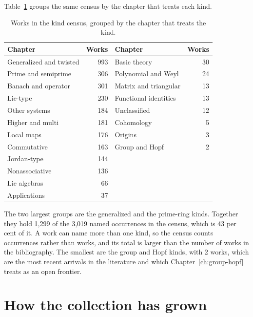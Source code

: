 Table~\ref{tab:atlas:kinds-chapters} groups the same census by the chapter that
treats each kind.

\begin{table}[htbp]
  \centering
  \caption{Works in the kind census, grouped by the chapter that treats the
  kind.}
  \label{tab:atlas:kinds-chapters}
  \begin{tabular}{lr@{\qquad}lr}
    \toprule
    Chapter & Works & Chapter & Works \\
    \midrule
    Generalized and twisted & 993 & Basic theory          & 30 \\
    Prime and semiprime     & 306 & Polynomial and Weyl   & 24 \\
    Banach and operator     & 301 & Matrix and triangular & 13 \\
    Lie-type                & 230 & Functional identities & 13 \\
    Other systems           & 184 & Unclassified          & 12 \\
    Higher and multi        & 181 & Cohomology            & 5  \\
    Local maps              & 176 & Origins               & 3  \\
    Commutative             & 163 & Group and Hopf        & 2  \\
    Jordan-type             & 144 &                       &    \\
    Nonassociative          & 136 &                       &    \\
    Lie algebras            & 66  &                       &    \\
    Applications            & 37  &                       &    \\
    \bottomrule
  \end{tabular}
\end{table}

The two largest groups are the generalized and the prime-ring kinds.
Together they hold 1,299 of the 3,019 named occurrences in the census, which is
43 per cent of it.
A work can name more than one kind, so the census counts occurrences rather
than works, and its total is larger than the number of works in the
bibliography.
The smallest are the group and Hopf kinds, with 2 works, which are the most
recent arrivals in the literature and which Chapter~\ref{ch:group-hopf} treats
as an open frontier.

\section{How the collection has grown}


